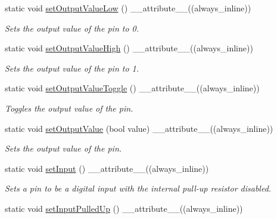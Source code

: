 \begin{DoxyCompactItemize}
static void \hyperlink{class_fast_g_p_i_o_1_1_pin_acff357765bbc7c56564a871d1bdd4868}{set\+Output\+Value\+Low} () \+\_\+\+\_\+attribute\+\_\+\+\_\+((always\+\_\+inline))
\begin{DoxyCompactList}\small\item\em Sets the output value of the pin to 0. \end{DoxyCompactList}\item 
static void \hyperlink{class_fast_g_p_i_o_1_1_pin_a69cae733ab5c400afbb2d731aa31f5f5}{set\+Output\+Value\+High} () \+\_\+\+\_\+attribute\+\_\+\+\_\+((always\+\_\+inline))
\begin{DoxyCompactList}\small\item\em Sets the output value of the pin to 1. \end{DoxyCompactList}\item 
static void \hyperlink{class_fast_g_p_i_o_1_1_pin_a588d0cdd8971e9a6a6939704b227f299}{set\+Output\+Value\+Toggle} () \+\_\+\+\_\+attribute\+\_\+\+\_\+((always\+\_\+inline))
\begin{DoxyCompactList}\small\item\em Toggles the output value of the pin. \end{DoxyCompactList}\item 
static void \hyperlink{class_fast_g_p_i_o_1_1_pin_a2caa56e4e3691227794a39f4b233eb67}{set\+Output\+Value} (bool value) \+\_\+\+\_\+attribute\+\_\+\+\_\+((always\+\_\+inline))
\begin{DoxyCompactList}\small\item\em Sets the output value of the pin. \end{DoxyCompactList}\item 
\mbox{\label{class_fast_g_p_i_o_1_1_pin_a7f9c4ab269f04bb1ae022b4d7eed3413}} 
static void \hyperlink{class_fast_g_p_i_o_1_1_pin_a7f9c4ab269f04bb1ae022b4d7eed3413}{set\+Input} () \+\_\+\+\_\+attribute\+\_\+\+\_\+((always\+\_\+inline))
\begin{DoxyCompactList}\small\item\em Sets a pin to be a digital input with the internal pull-\/up resistor disabled. \end{DoxyCompactList}\item 
\mbox{\label{class_fast_g_p_i_o_1_1_pin_a32eadc02b421b9b7fc92807bb3304f6e}} 
static void \hyperlink{class_fast_g_p_i_o_1_1_pin_a32eadc02b421b9b7fc92807bb3304f6e}{set\+Input\+Pulled\+Up} () \+\_\+\+\_\+attribute\+\_\+\+\_\+((always\+\_\+inline))

\end{DoxyCompactItemize}
